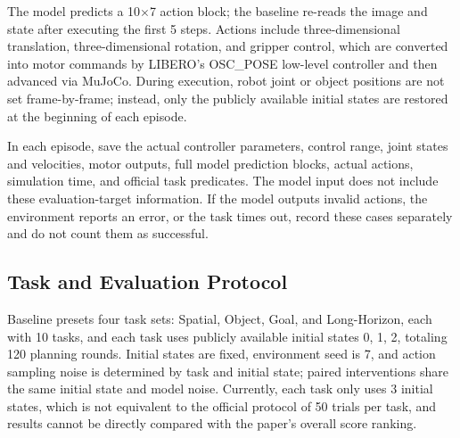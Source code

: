 The model predicts a 10\(\times\)7 action block; the baseline re-reads the image and state after executing the first 5 steps. Actions include three-dimensional translation, three-dimensional rotation, and gripper control, which are converted into motor commands by LIBERO's OSC\_POSE low-level controller and then advanced via MuJoCo. During execution, robot joint or object positions are not set frame-by-frame; instead, only the publicly available initial states are restored at the beginning of each episode.

In each episode, save the actual controller parameters, control range, joint states and velocities, motor outputs, full model prediction blocks, actual actions, simulation time, and official task predicates. The model input does not include these evaluation-target information. If the model outputs invalid actions, the environment reports an error, or the task times out, record these cases separately and do not count them as successful.


\subsection{Task and Evaluation Protocol}\label{s08-detail-3}

Baseline presets four task sets: Spatial, Object, Goal, and Long-Horizon, each with 10 tasks, and each task uses publicly available initial states 0, 1, 2, totaling 120 planning rounds. Initial states are fixed, environment seed is 7, and action sampling noise is determined by task and initial state; paired interventions share the same initial state and model noise. Currently, each task only uses 3 initial states, which is not equivalent to the official protocol of 50 trials per task, and results cannot be directly compared with the paper's overall score ranking.

